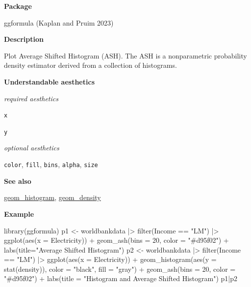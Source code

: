 \documentclass[
  letterpaper,
  DIV=11,
  numbers=noendperiod]{scrreprt}
\newenvironment{Shaded}{\begin{snugshade}}{\end{snugshade}}
\newcommand{\AttributeTok}[1]{\textcolor[rgb]{0.40,0.45,0.13}{#1}}
\newcommand{\DecValTok}[1]{\textcolor[rgb]{0.68,0.00,0.00}{#1}}
\newcommand{\FunctionTok}[1]{\textcolor[rgb]{0.28,0.35,0.67}{#1}}
\newcommand{\NormalTok}[1]{\textcolor[rgb]{0.00,0.23,0.31}{#1}}
\newcommand{\OtherTok}[1]{\textcolor[rgb]{0.00,0.23,0.31}{#1}}
\newcommand{\SpecialCharTok}[1]{\textcolor[rgb]{0.37,0.37,0.37}{#1}}
\newcommand{\StringTok}[1]{\textcolor[rgb]{0.13,0.47,0.30}{#1}}
\begin{document}
\textbf{Package}

ggformula (Kaplan and Pruim 2023)

\textbf{Description}

Plot Average Shifted Histogram (ASH). The ASH is a nonparametric
probability density estimator derived from a collection of histograms.

\textbf{Understandable aesthetics}

\emph{required aesthetics}

\texttt{x}

\texttt{y}

\emph{optional aesthetics}

\texttt{color}, \texttt{fill}, \texttt{bins}, \texttt{alpha},
\texttt{size}

\textbf{See also}

\hyperref[histogram]{geom\_histogram}, \hyperref[density]{geom\_density}

\textbf{Example}

\begin{Shaded}
\begin{Highlighting}[]
\FunctionTok{library}\NormalTok{(ggformula)}
\NormalTok{p1 }\OtherTok{\textless{}{-}}\NormalTok{ worldbankdata }\SpecialCharTok{|\textgreater{}}
  \FunctionTok{filter}\NormalTok{(Income }\SpecialCharTok{==} \StringTok{"LM"}\NormalTok{) }\SpecialCharTok{|\textgreater{}}
  \FunctionTok{ggplot}\NormalTok{(}\FunctionTok{aes}\NormalTok{(}\AttributeTok{x =}\NormalTok{ Electricity)) }\SpecialCharTok{+}
   \FunctionTok{geom\_ash}\NormalTok{(}\AttributeTok{bins =} \DecValTok{20}\NormalTok{, }\AttributeTok{color =} \StringTok{"\#d95f02"}\NormalTok{) }\SpecialCharTok{+}   \FunctionTok{labs}\NormalTok{(}\AttributeTok{title=}\StringTok{"Average Shifted Histogram"}\NormalTok{)}
\NormalTok{p2 }\OtherTok{\textless{}{-}}\NormalTok{ worldbankdata }\SpecialCharTok{|\textgreater{}}
  \FunctionTok{filter}\NormalTok{(Income }\SpecialCharTok{==} \StringTok{"LM"}\NormalTok{) }\SpecialCharTok{|\textgreater{}}
  \FunctionTok{ggplot}\NormalTok{(}\FunctionTok{aes}\NormalTok{(}\AttributeTok{x =}\NormalTok{ Electricity)) }\SpecialCharTok{+}
  \FunctionTok{geom\_histogram}\NormalTok{(}\FunctionTok{aes}\NormalTok{(}\AttributeTok{y =} \FunctionTok{stat}\NormalTok{(density)), }\AttributeTok{color =} \StringTok{"black"}\NormalTok{, }\AttributeTok{fill =} \StringTok{"gray"}\NormalTok{) }\SpecialCharTok{+}
   \FunctionTok{geom\_ash}\NormalTok{(}\AttributeTok{bins =} \DecValTok{20}\NormalTok{, }\AttributeTok{color =} \StringTok{"\#d95f02"}\NormalTok{) }\SpecialCharTok{+} \FunctionTok{labs}\NormalTok{(}\AttributeTok{title =} \StringTok{"Histogram and Average Shifted Histogram"}\NormalTok{)}
\NormalTok{p1}\SpecialCharTok{|}\NormalTok{p2}
\end{Highlighting}
\end{Shaded}
\end{document}
